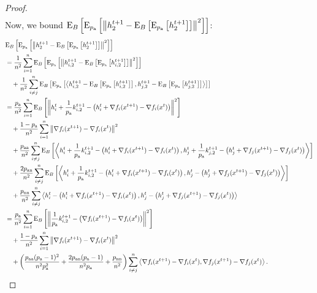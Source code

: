 \documentclass{article}
\newcommand*{\probavailable}{\ensuremath{p_{\textnormal{a}}}}
\newcommand*{\probpairaa}{\ensuremath{p_{\textnormal{aa}}}}
\newcommand*{\probpairan}{\ensuremath{p_{\textnormal{an}}}}
\newcommand*{\probpairnn}{\ensuremath{p_{\textnormal{nn}}}}
\begin{document}
\begin{proof}
\begin{align*}
  \end{align*}
  Now, we bound $\ExpSub{B}{\ExpSub{\probavailable}{\norm{h^{t+1}_{2} - \ExpSub{B}{\ExpSub{\probavailable}{h^{t+1}_{2}}}}^2}}$:
  \begin{align*}
    &\ExpSub{B}{\ExpSub{\probavailable}{\norm{h^{t+1}_{2} - \ExpSub{B}{\ExpSub{\probavailable}{h^{t+1}_{2}}}}^2}}\\
    &=\frac{1}{n^2}\sum_{i=1}^n\ExpSub{B}{\ExpSub{\probavailable}{\norm{h^{t+1}_{i,2} - \ExpSub{B}{\ExpSub{\probavailable}{h^{t+1}_{i,2}}}}^2}} \\
    &\quad +\frac{1}{n^2}\sum_{i\neq j}^n\ExpSub{B}{\ExpSub{\probavailable}{\inp{h^{t+1}_{i,2} - \ExpSub{B}{\ExpSub{\probavailable}{h^{t+1}_{i,2}}}}{h^{t+1}_{j,2} - \ExpSub{B}{\ExpSub{\probavailable}{h^{t+1}_{j,2}}}}}} \\
    &=\frac{\probavailable}{n^2}\sum_{i=1}^n\ExpSub{B}{\norm{h^t_i + \frac{1}{\probavailable} k^{t+1}_{i, 2} - \left(h^t_i + \nabla f_i(x^{t+1}) - \nabla f_i(x^{t})\right)}^2} \\
    &\quad + \frac{1 - \probavailable}{n^2}\sum_{i=1}^n\norm{\nabla f_i(x^{t+1}) - \nabla f_i(x^{t})}^2 \\
    &\quad +\frac{\probpairaa}{n^2}\sum_{i\neq j}^n\ExpSub{B}{\inp{h^t_i + \frac{1}{\probavailable} k^{t+1}_{i, 2} - \left(h^t_i + \nabla f_i(x^{t+1}) - \nabla f_i(x^{t})\right)}{h^t_j + \frac{1}{\probavailable} k^{t+1}_{j, 2} - \left(h^t_j + \nabla f_j(x^{t+1}) - \nabla f_j(x^{t})\right)}} \\
    &\quad +\frac{2\probpairan}{n^2}\sum_{i\neq j}^n\ExpSub{B}{\inp{h^t_i + \frac{1}{\probavailable} k^{t+1}_{i, 2} - \left(h^t_i + \nabla f_i(x^{t+1}) - \nabla f_i(x^{t})\right)}{h^t_j - \left(h^t_j + \nabla f_j(x^{t+1}) - \nabla f_j(x^{t})\right)}} \\
    &\quad +\frac{\probpairnn}{n^2}\sum_{i\neq j}^n\inp{h^t_i - \left(h^t_i + \nabla f_i(x^{t+1}) - \nabla f_i(x^{t})\right)}{h^t_j - \left(h^t_j + \nabla f_j(x^{t+1}) - \nabla f_j(x^{t})\right)} \\
    &=\frac{\probavailable}{n^2}\sum_{i=1}^n\ExpSub{B}{\norm{\frac{1}{\probavailable} k^{t+1}_{i, 2} - \left(\nabla f_i(x^{t+1}) - \nabla f_i(x^{t})\right)}^2} \\
    &\quad + \frac{1 - \probavailable}{n^2}\sum_{i=1}^n\norm{\nabla f_i(x^{t+1}) - \nabla f_i(x^{t})}^2 \\
    &\quad +\left(\frac{\probpairaa (\probavailable - 1)^2}{n^2 \probavailable^2} + \frac{2\probpairan (\probavailable - 1)}{n^2 \probavailable} + \frac{\probpairnn}{n^2}\right)\sum_{i\neq j}^n\inp{\nabla f_i(x^{t+1}) - \nabla f_i(x^{t})}{\nabla f_j(x^{t+1}) - \nabla f_j(x^{t})}.

\end{align*}
\end{proof}
\end{document}
